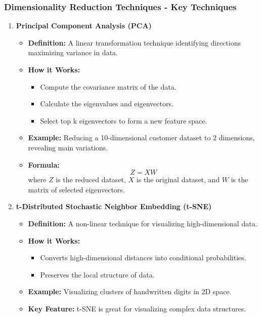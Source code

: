 \documentclass[aspectratio=169]{beamer}
\begin{document}
\begin{frame}[fragile]
    \frametitle{Dimensionality Reduction Techniques - Key Techniques}
    \begin{enumerate}
        \item \textbf{Principal Component Analysis (PCA)}
        \begin{itemize}
            \item \textbf{Definition:} A linear transformation technique identifying directions maximizing variance in data.
            \item \textbf{How it Works:}
            \begin{itemize}
                \item Compute the covariance matrix of the data.
                \item Calculate the eigenvalues and eigenvectors.
                \item Select top k eigenvectors to form a new feature space.
            \end{itemize}
            \item \textbf{Example:} Reducing a 10-dimensional customer dataset to 2 dimensions, revealing main variations.
            \item \textbf{Formula:}
            \begin{equation}
                Z = XW
            \end{equation}
            where \(Z\) is the reduced dataset, \(X\) is the original dataset, and \(W\) is the matrix of selected eigenvectors.
        \end{itemize}
        
        \item \textbf{t-Distributed Stochastic Neighbor Embedding (t-SNE)}
        \begin{itemize}
            \item \textbf{Definition:} A non-linear technique for visualizing high-dimensional data.
            \item \textbf{How it Works:}
            \begin{itemize}
                \item Converts high-dimensional distances into conditional probabilities.
                \item Preserves the local structure of data.
            \end{itemize}
            \item \textbf{Example:} Visualizing clusters of handwritten digits in 2D space.
            \item \textbf{Key Feature:} t-SNE is great for visualizing complex data structures.
        \end{itemize}
    \end{enumerate}
\end{frame}
\end{document}
